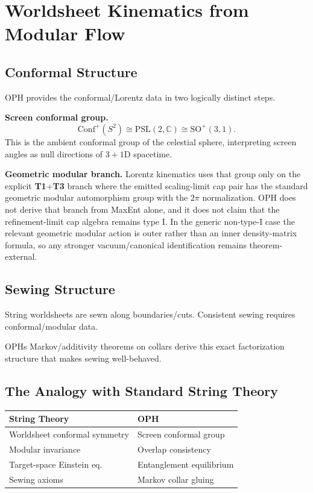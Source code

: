 \section{Worldsheet Kinematics from Modular Flow}\label{6-worldsheet-kinematics-from-modular-flow}

\subsection{Conformal Structure}\label{61-conformal-structure}

OPH provides the conformal/Lorentz data in two logically distinct steps.

\textbf{Screen conformal group.}
\[
\mathrm{Conf}^+(S^2)\cong \mathrm{PSL}(2,\mathbb C)\cong \mathrm{SO}^+(3,1).
\]
This is the ambient conformal group of the celestial sphere, interpreting screen angles as null directions of \(3+1\)D spacetime.

\textbf{Geometric modular branch.} Lorentz kinematics uses that group only on the explicit \textbf{T1}+\textbf{T3} branch where the emitted scaling-limit cap pair has the standard geometric modular automorphism group with the \(2\pi\) normalization. OPH does not derive that branch from MaxEnt alone, and it does not claim that the refinement-limit cap algebra remains type I. In the generic non-type-I case the relevant geometric modular action is outer rather than an inner density-matrix formula, so any stronger vacuum/canonical identification remains theorem-external.
\subsection{Sewing Structure}\label{62-sewing-structure}

String worldsheets are sewn along boundaries/cuts. Consistent sewing requires conformal/modular data.

OPH\textquotesingle s Markov/additivity theorems on collars derive this exact factorization structure that makes sewing well-behaved.

\subsection{The Analogy with Standard String Theory}\label{63-the-analogy-with-standard-string-theory}

{\def\LTcaptype{none} %
\begin{longtable}[]{@{}>{\RaggedRight\arraybackslash}p{}>{\RaggedRight\arraybackslash}p{}@{}}
\toprule\noalign{}
String Theory & OPH \\
\midrule\noalign{}
\endhead
\bottomrule\noalign{}
\endlastfoot
Worldsheet conformal symmetry & Screen conformal group \\
Modular invariance & Overlap consistency \\
Target-space Einstein eq. & Entanglement equilibrium \\
Sewing axioms & Markov collar gluing \\
\end{longtable}
}

